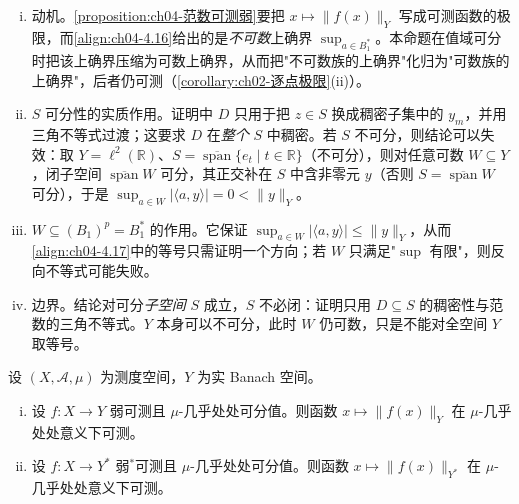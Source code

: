 \documentclass[../../main.tex]{subfiles}%
\begin{document}
\begin{remark}\label{remark:ch04-可数支撑范数动机}
\begin{enumerate}[(i)]
\item 动机。\cref{proposition:ch04-范数可测弱}要把 $x\mapsto\|f(x)\|_Y$ 写成可测函数的极限，而\eqref{align:ch04-4.16}给出的是\emph{不可数}上确界 $\sup_{a\in B_1^*}$。本命题在值域可分时把该上确界压缩为可数上确界，从而把"不可数族的上确界"化归为"可数族的上确界"，后者仍可测（\cref{corollary:ch02-逐点极限}(ii)）。
\item $S$ 可分性的实质作用。证明中 $D$ 只用于把 $z\in S$ 换成稠密子集中的 $y_m$，并用三角不等式过渡；这要求 $D$ 在\emph{整个} $S$ 中稠密。若 $S$ 不可分，则结论可以失效：取 $Y=\ell^2(\mathbb{R})$、$S=\overline{\operatorname{span}}\{e_t\mid t\in\mathbb{R}\}$（不可分），则对任意可数 $W\subseteq Y$，闭子空间 $\overline{\operatorname{span}}W$ 可分，其正交补在 $S$ 中含非零元 $y$（否则 $S=\overline{\operatorname{span}}W$ 可分），于是 $\sup_{a\in W}|\langle a,y\rangle|=0<\|y\|_Y$。
\item $W\subseteq(B_1)^p=B_1^*$ 的作用。它保证 $\sup_{a\in W}|\langle a,y\rangle|\leqslant\|y\|_Y$，从而\eqref{align:ch04-4.17}中的等号只需证明一个方向；若 $W$ 只满足"$\sup$ 有限"，则反向不等式可能失败。
\item 边界。结论对可分\emph{子空间} $S$ 成立，$S$ 不必闭：证明只用 $D\subseteq S$ 的稠密性与范数的三角不等式。$Y$ 本身可以不可分，此时 $W$ 仍可数，只是不能对全空间 $Y$ 取等号。
\end{enumerate}
\end{remark}

\begin{proposition}\label{proposition:ch04-范数可测弱}
设 $(X,\mathcal{A},\mu)$ 为测度空间，$Y$ 为实 Banach 空间。
\begin{enumerate}[(i)]
\item 设 $f:X\to Y$ 弱可测且 $\mu$-几乎处处可分值。则函数 $x\mapsto\|f(x)\|_Y$ 在 $\mu$-几乎处处意义下可测。
\item 设 $f:X\to Y^*$ 弱$^*$可测且 $\mu$-几乎处处可分值。则函数 $x\mapsto\|f(x)\|_{Y^*}$ 在 $\mu$-几乎处处意义下可测。
\end{enumerate}
\end{proposition}
\end{document}
